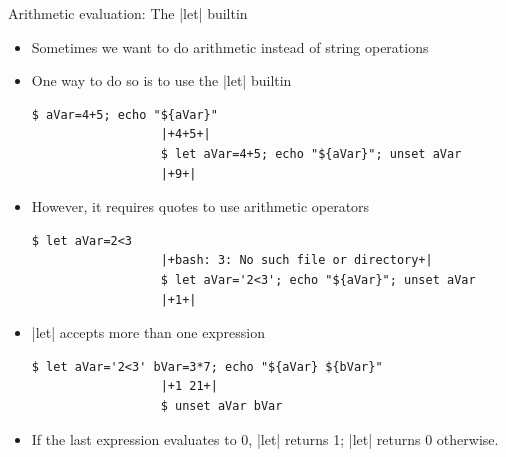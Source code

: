 \begin{frame}[fragile]{Arithmetic evaluation: The \bash|let| builtin}
    \vspace{-3mm}
    \begin{itemize}
        \item Sometimes we want to do arithmetic instead of string operations
        \item One way to do so is to use the \bash|let| builtin
              \begin{lstlisting}[style=MyBash, style=oddnumbers, aboveskip=2mm, belowskip=-6mm]
                  $ aVar=4+5; echo "${aVar}"
                  |+4+5+|
                  $ let aVar=4+5; echo "${aVar}"; unset aVar
                  |+9+|
              \end{lstlisting}
        \item However, it requires quotes to use arithmetic operators 
              \begin{lstlisting}[style=MyBash, style=oddnumbers, aboveskip=2mm, belowskip=-6mm, firstnumber=4]
                  $ let aVar=2<3
                  |+bash: 3: No such file or directory+|
                  $ let aVar='2<3'; echo "${aVar}"; unset aVar
                  |+1+|
              \end{lstlisting}
        \item \bash|let| accepts more than one expression
              \begin{lstlisting}[style=MyBash, style=oddnumbers, aboveskip=2mm, belowskip=-6mm, firstnumber=8]
                  $ let aVar='2<3' bVar=3*7; echo "${aVar} ${bVar}"
                  |+1 21+|
                  $ unset aVar bVar
              \end{lstlisting}
        \item If the last expression evaluates to 0, \bash|let| returns 1; \bash|let| returns 0 otherwise.
    \end{itemize}
\end{frame}
